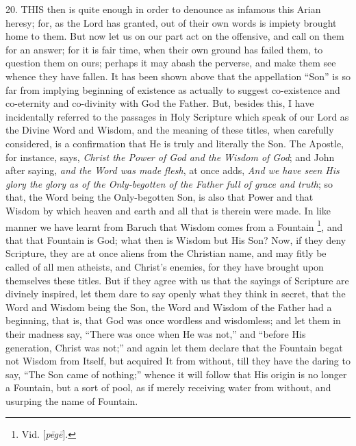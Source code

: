 20. THIS
then is quite enough in order to denounce as infamous this Arian
heresy; for, as the Lord has granted, out of their own words is
impiety brought home to them. But now let us on our part act on the
offensive, and call on them for an answer; for it is fair time, when
their own ground has failed them, to question them on ours; perhaps it
may abash the perverse, and make them see whence they have fallen. It
has been shown above that the appellation ``Son'' is so far from
implying beginning of existence as actually to suggest co-existence
and co-eternity and co-divinity with God the Father. But, besides
this, I have incidentally referred to the passages in Holy Scripture
which speak of our Lord as the Divine Word and Wisdom, and the meaning
of these titles, when carefully considered, is a confirmation that He
is truly and literally the Son. The Apostle, for instance, says, \emph{Christ
the Power of God and the Wisdom of God}; and John after saying, \emph{and
the Word was made flesh}, at once adds, \emph{And we have seen His
glory the glory as of the Only-begotten of the Father full of grace
and truth}; so that, the Word being the Only-begotten Son, is also
that Power and that Wisdom by which heaven and earth and all that is
therein were made. In like manner we have learnt from Baruch that
Wisdom comes from a Fountain \footnote{Vid. [\emph{p\={e}g\={e}}].}, and that that Fountain is God; what then is Wisdom but His
Son? Now, if they deny Scripture, they are at once aliens from the
Christian name, and may fitly be called of all men atheists, and
Christ's enemies, for they have brought upon themselves these titles.
But if they agree with us that the sayings of Scripture are divinely
inspired, let them dare to say openly what they think in secret, that
the Word and Wisdom being the Son, the Word and Wisdom of the
Father had a beginning, that is, that God was once wordless and
wisdomless; and let them in their madness say, ``There was once when He
was not,'' and ``before His generation, Christ was not;'' and again let
them declare that the Fountain begat not Wisdom from Itself, but
acquired It from without, till they have the daring to say, ``The Son
came of nothing;'' whence it will follow that His origin is no longer a
Fountain, but a sort of pool, as if merely receiving water from
without, and usurping the name of Fountain.

